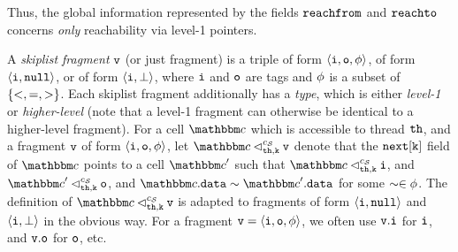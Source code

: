 Thus, the global information represented by the fields $\mathtt{reachfrom}$ and
$\mathtt{reachto}$ concerns {\em only} reachability via level-1 pointers.

A {\em skiplist fragment} $\mathtt{v}$ (or just fragment)
is a triple of form
$\left\langle\mathtt{i},\mathtt{o},\phi\right\rangle$, of form
$\left\langle\mathtt{i},{\tt null}\right\rangle$, or of form
$\left\langle\mathtt{i},\bot\right\rangle$,
where $\mathtt{i}$ and $\mathtt{o}$ are tags
    and $\phi$ is a subset of $\left\{<, =, >\right\}$.
    Each skiplist fragment additionally has a {\em type}, which is
    either {\em level-1} or {\em higher-level} (note that a level-1 fragment
    can otherwise be identical to a higher-level fragment).
For a cell $\cell$ which is accessible to thread ${\tt th}$, and a fragment
$\mathtt{v}$ of form $\left\langle\mathtt{i},\mathtt{o},\phi\right\rangle$, let $\cell \lsatfrag{\klevel}{\thread}{\sconf}\frag$ denote that
the ${\tt next[k]}$ field of $\cell$ points to a cell $\cell'$ such that
  $\cell \lsatfrag{\klevel}{\thread}{\sconf} \inat{\frag}$,
and
$\cell' \lsatfrag{\klevel}{\thread}{\sconf} \outat{\frag}$, and 
  $\cell.\mathtt{data} \sim \cell'.\mathtt{data}$ for some $\sim \in \phi$.
The definition of $\cell \lsatfrag{\klevel}{\thread}{\sconf}\frag$
is adapted to fragments of form
$\left\langle\mathtt{i},{\tt null}\right\rangle$ and $\left\langle\mathtt{i},\bot\right\rangle$ in the
obvious way. For a fragment $\mathtt{v} = \left\langle\mathtt{i},\mathtt{o},\phi\right\rangle$, we often use
$\mathtt{v}.\mathtt{i}$ for $\mathtt{i}$, and
$\mathtt{v}.\mathtt{o}$ for $\mathtt{o}$, etc.


